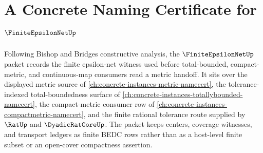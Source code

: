 \chapter{A Concrete Naming Certificate for $\FiniteEpsilonNetUp$}
\label{ch:concrete-instances-finite-epsilon-net-namecert}

Following Bishop and Bridges constructive analysis, the $\FiniteEpsilonNetUp$ packet records the finite epsilon-net witness used before total-bounded, compact-metric, and continuous-map consumers read a metric handoff. It sits over the displayed metric source of \autoref{ch:concrete-instances-metric-namecert}, the tolerance-indexed total-boundedness surface of \autoref{ch:concrete-instances-totallybounded-namecert}, the compact-metric consumer row of \autoref{ch:concrete-instances-compactmetric-namecert}, and the finite rational tolerance route supplied by $\RatUp$ and $\DyadicRatCoreUp$. The packet keeps centers, coverage witnesses, and transport ledgers as finite BEDC rows rather than as a host-level finite subset or an open-cover compactness assertion.


